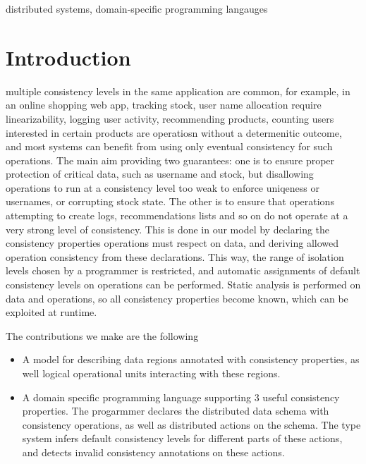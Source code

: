 \documentclass[preprint]{sigplanconf}
\begin{document}


\keywords
distributed systems, domain-specific programming langauges

\section{Introduction}
multiple consistency levels in the same application are common, for example, in
an online shopping web app, tracking stock, user name allocation require
linearizability, logging user activity, recommending products, counting users
interested in certain products are operatiosn without a determenitic outcome,
and most systems can benefit from using only eventual consistency for such
operations. The main aim providing two guarantees: one is to ensure proper protection of critical data, such
as username and stock, but disallowing operations to run at a consistency level
too weak to enforce uniqeness or usernames, or corrupting stock state. The other
is to ensure that operations attempting to create logs, recommendations lists
and so on do not operate at a very strong level of consistency. This is done in
our model by declaring the consistency properties operations must respect on
data, and deriving allowed operation consistency from these declarations. This
way, the range of isolation levels chosen by a programmer is restricted, and
automatic assignments of default consistency levels on operations can be
performed. Static analysis is performed on data and operations, so all
consistency properties become known, which can be exploited at runtime.

The contributions we make are the following 
\begin{itemize}
  \item A model for describing data regions annotated with consistency
    properties, as well logical operational units interacting with these
    regions.
  \item A domain specific programming language supporting 3 useful consistency
    properties. The progarmmer declares the distributed data schema with
    consistency operations, as well as distributed actions on the schema. The
    type system infers default consistency levels for different parts of these
    actions, and detects invalid consistency annotations on these actions. 
\end{itemize}
\end{document}
